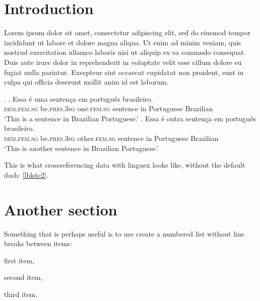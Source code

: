 \documentclass[11pt]{article} %
\begin{document}
\setlength{\Extopsep}{0in} %

\setlength{\parindent}{0pt} %




\section{Introduction} 

Lorem ipsum dolor sit amet, consectetur adipiscing elit, sed do eiusmod tempor incididunt ut labore et dolore magna aliqua. Ut enim ad minim veniam, quis nostrud exercitation ullamco laboris nisi ut aliquip ex ea commodo consequat. Duis aute irure dolor in reprehenderit in voluptate velit esse cillum dolore eu fugiat nulla pariatur. Excepteur sint occaecat cupidatat non proident, sunt in culpa qui officia deserunt mollit anim id est laborum.

\ex.    \ag. Essa \'{e} uma senten\c{c}a em portugu\^{e}s brasileiro.\\
            \textsc{dem.fem.sg} be.\textsc{pres.3sg} one.\textsc{fem.sg} sentence in Portuguese Brazilian\\
            `This is a sentence in Brazilian Portuguese.'\label{lblstc1}
        \bg.    Essa \'{e} outra senten\c{c}a em portugu\^{e}s brasileiro.\\
            \textsc{dem.fem.sg} be.\textsc{pres.3sg} other.\textsc{fem.sg} sentence in Portuguese Brazilian\\
            `This is another sentence in Brazilian Portuguese.'\label{lblstc2}

This is what crossreferencing data with linguex looks like,  without the default dash: \ref{lblstc2}.

\section{Another section}

Something that is perhaps useful is to use create a numbered list without line breaks between items: \begin{inparaenum}[(i)]
    \item first item,
    \item second item,
    \item third item.
\end{inparaenum}
\end{document}
